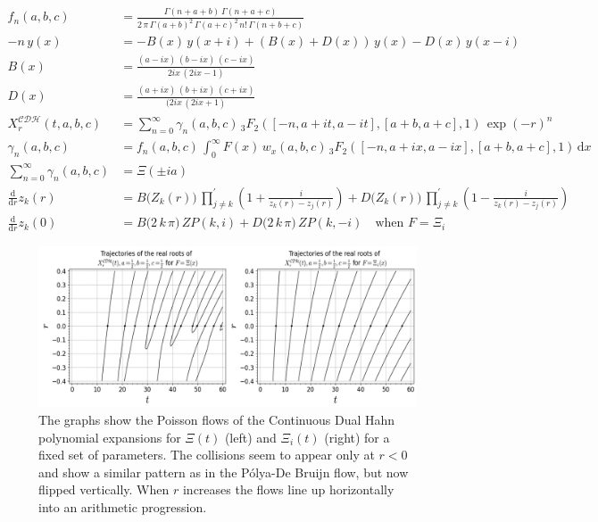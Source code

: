 \documentclass[a4paper,11pt,twoside]{amsart}
\newcommand{\verifiedeq}{=}
\newcommand{\verifiedeq}{\stackrel{\checkmark}{=}}
\begin{document}
\begin{small}
{\begin{minipage}{\textwidth}
\begin{align}
  f_n(a,b,c) &\verifiedeq \frac{\Gamma(n+a+b)\,\Gamma(n+a+c)}{2\,\pi\,\Gamma(a+b)^2\,\Gamma(a+c)^2\,n!\,\Gamma(n+b+c)} \\
  -n\,y(x) &\verifiedeq -B(x)\,y(x+i)+\left(B(x)+D(x)\right)\,y(x)-D(x)\,y(x-i) \\
  B(x)&\verifiedeq\frac{(a-ix)\,(b-ix)\,(c-ix)}{2ix\,(2ix-1)} \\
  D(x)&\verifiedeq\frac{(a+ix)\,(b+ix)\,(c+ix)}{(2ix\,(2ix+1)} \\
  X^\mathcal{CDH}_r(t,a,b,c) &\verifiedeq \sum_{n=0}^\infty \gamma_n(a,b,c)\,{}_3F_2\left([-n, a+it, a-it],[a+b,a+c],1\right)\,\exp\left(-r\right)^n \\ 
  \gamma_n(a,b,c) &\verifiedeq f_n(a,b,c)\,\int_{0}^{\infty} F(x)\,w_x(a,b,c)\,{}_3F_2\left([-n, a+ix, a-ix],[a+b,a+c],1\right)\,\mathrm{d}x \\
  \sum_{n=0}^\infty \gamma_n(a,b,c) &\verifiedeq \Xi(\pm ia) \\
  \frac{\mathrm{d}}{\mathrm{d} r} z_k(r)&\verifiedeq B\big(Z_k(r)\big)\,\prod_{j \ne k}^{'} \left(1+\frac{i}{z_k(r)-z_j(r)}\right)+D\big(Z_k(r)\big)\,\prod_{j \ne k}^{'} \left(1-\frac{i}{z_k(r)-z_j(r)}\right) \\
  \frac{\mathrm{d}}{\mathrm{d} r} z_k(0)&\verifiedeq B\big(2\,k\,\pi\big)\,ZP(k,i)+D\big(2\,k\,\pi)\,ZP(k,-i)\quad \text{when } F=\Xi_i 
\end{align}
\end{minipage}}
\begin{figure}[H]
  \includegraphics[width=1\linewidth]{ContDualHahnFlowdouble.jpeg}
  \caption{The graphs show the Poisson flows of the Continuous Dual Hahn polynomial expansions for $\Xi(t)$ (left) and $\Xi_i(t)$ (right) for a fixed set of parameters. The collisions seem to appear only at $r < 0$ and show a similar pattern as in the Pólya-De Bruijn flow, but now flipped vertically. When $r$ increases the flows line up horizontally into an arithmetic progression.}
  \label{fig:flowLCDH}
\end{figure}

\end{small}
\end{document}
